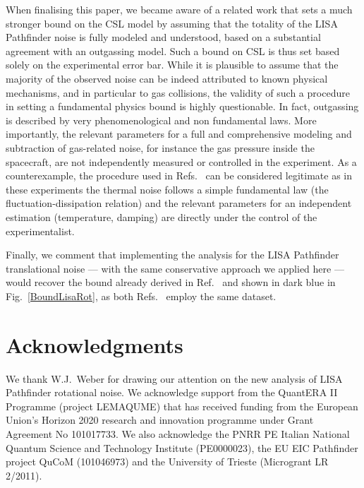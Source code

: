 \documentclass[aps,twocolumn,pra,superscriptaddress]{revtex4-2}
\begin{document}
{{When finalising this paper, we became aware of a related work \cite{dai2024updatingconstraintquantumcollapse} that sets a much stronger bound on the CSL model by assuming that the totality of the LISA Pathfinder noise is fully modeled and understood, based on a substantial agreement with an outgassing model. Such a  bound on CSL is thus set based solely on the experimental error bar. While it is plausible to assume that the majority of the observed noise can be indeed attributed to known physical mechanisms, and in particular to gas collisions, the validity of such a procedure in setting a fundamental physics bound is highly questionable. In fact, outgassing is described by very phenomenological and non fundamental laws. More importantly, the relevant parameters for a full and comprehensive modeling and subtraction of gas-related noise, for instance the gas pressure inside the spacecraft, are not independently measured or controlled in the experiment. As a counterexample, the procedure used in Refs.~\cite{vinante2016upper,vinante2017improved,Vinante_2020} can be considered legitimate as in these experiments the thermal noise follows a simple fundamental law (the fluctuation-dissipation relation) and the relevant parameters for an independent estimation (temperature, damping) are directly under the control of the experimentalist.} 

Finally, we comment that implementing the analysis for the LISA Pathfinder translational noise --- with the same conservative approach we applied here --- would recover the bound already derived in Ref.~\cite{carlesso2018non} and shown in dark blue in Fig.~\ref{BoundLisaRot}, as both Refs.~\cite{carlesso2018non,dai2024updatingconstraintquantumcollapse}  employ the same dataset.



\section{Acknowledgments}
We thank W.J.~Weber for drawing our attention on the new analysis of LISA Pathfinder rotational noise. 
We acknowledge support from the QuantERA II Programme (project LEMAQUME) that has received funding from the European Union’s Horizon 2020 research and innovation programme under Grant Agreement No 101017733. We also acknowledge the PNRR PE Italian National Quantum Science and Technology Institute (PE0000023), {the EU EIC Pathfinder project QuCoM (101046973)} and the University of Trieste (Microgrant LR 2/2011).

}
\end{document}
